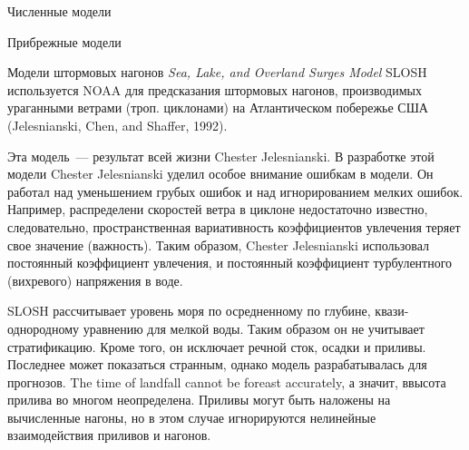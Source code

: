 \begin{chapter}{Численные модели}
\begin{section}{Прибрежные модели}
\begin{paragraph}{Модели штормовых нагонов}
\emph{Sea, Lake, and Overland Surges Model} SLOSH используется NOAA
для предсказания штормовых нагонов, производимых ураганными ветрами
(троп. циклонами) на Атлантическом побережье США (Jelesnianski, Chen,
and Shaffer, 1992).
%

Эта модель~--- результат всей жизни Chester Jelesnianski. В разработке
этой модели Chester Jelesnianski уделил особое внимание ошибкам в
модели. Он работал над уменьшением грубых ошибок и над игнорированием
мелких ошибок. Например, распределени скоростей ветра в циклоне
недостаточно известно, следовательно, пространственная вариативность
коэффициентов увлечения теряет свое значение (важность). Таким
образом, Chester Jelesnianski использовал постоянный коэффициент
увлечения, и постоянный коэффициент турбулентного (вихревого)
напряжения в воде.
%

SLOSH рассчитывает уровень моря по осредненному по глубине,
квази-однородному уравнению для мелкой воды. Таким образом он не
учитывает стратификацию. Кроме того, он исключает речной сток, осадки
и приливы. Последнее может показаться странным, однако модель
разрабатывалась для прогнозов. The time of landfall cannot be foreast
accurately, а значит, ввысота прилива во многом неопределена. Приливы
могут быть наложены на вычисленные нагоны, но в этом случае
игнорируются нелинейные взаимодействия приливов и нагонов.
%


\end{paragraph}
\end{section}
\end{chapter}

